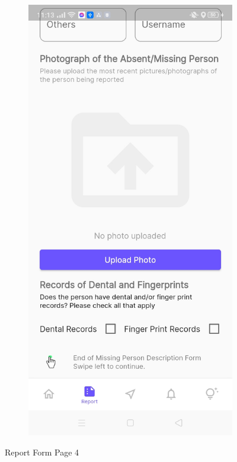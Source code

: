 \begin{figure}[!h]
\begin{subfigure}[c]{0.30\linewidth}
        \centering
        \includegraphics[scale=0.15]{figures/Chapter4/Main/p4-4.jpg}
    \end{subfigure}
    \caption{Report Form Page 4}
    \label{fig:ReportPage4}
\end{figure}

